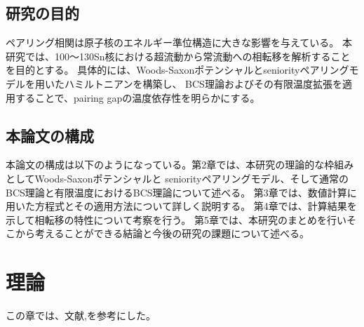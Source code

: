 \documentclass[a4paper,11pt]{jsreport}
\begin{document}
  \section{研究の目的}
  ペアリング相関は原子核のエネルギー準位構造に大きな影響を与えている。
  本研究では、100〜130Sn核における超流動から常流動への相転移を解析することを目的とする。
  具体的には、Woods-Saxonポテンシャルとseniorityペアリングモデルを用いたハミルトニアンを構築し、
  BCS理論およびその有限温度拡張を適用することで、pairing gapの温度依存性を明らかにする。

  \section{本論文の構成}
  本論文の構成は以下のようになっている。第2章では、本研究の理論的な枠組みとしてWoods-Saxonポテンシャルと
  seniorityペアリングモデル、そして通常のBCS理論と有限温度におけるBCS理論について述べる。
  第3章では、数値計算に用いた方程式とその適用方法について詳しく説明する。
  第4章では、計算結果を示して相転移の特性について考察を行う。
  第5章では、本研究のまとめを行いそこから考えることができる結論と今後の研究の課題について述べる。

\chapter{理論}
この章では、文献\cite{nucleus.pdf},\cite{thenuclearmanybody}を参考にした。
\end{document}
